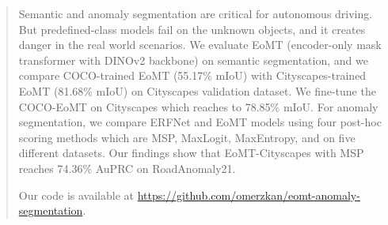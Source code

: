 \begin{abstract}

Semantic and anomaly segmentation are critical for autonomous driving. 
But predefined-class models fail on the unknown objects, and it creates danger in the real world scenarios. 
We evaluate EoMT (encoder-only mask transformer with DINOv2 backbone) on semantic segmentation, and we compare COCO-trained EoMT (55.17\% mIoU) with Cityscapes-trained EoMT (81.68\% mIoU) on Cityscapes validation dataset. 
We fine-tune the COCO-EoMT on Cityscapes which reaches to 78.85\% mIoU. 
For anomaly segmentation, we compare ERFNet and EoMT models using four post-hoc scoring methods which are MSP, MaxLogit, MaxEntropy, and  on five different datasets. 
Our findings show that EoMT-Cityscapes with MSP reaches 74.36\% AuPRC on RoadAnomaly21. 

Our code is available at \url{https://github.com/omerzkan/eomt-anomaly-segmentation}.

\end{abstract}


